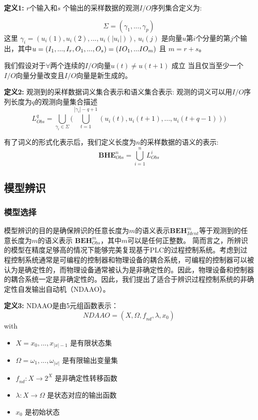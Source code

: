 \textbf{定义1:} \( r \)个输入和$ s $ 个输出的采样数据的观测$I/O$序列集合定义为:

\begin{equation} 
\Sigma = (\gamma_1,...,\gamma_p) 
\end{equation} 这里 $\gamma_i = (u_i(1),u_i(2),...,u_i(|u_i|))$, $ u_i(j) $ 是向量$u$第$i$个分量的第$j$个输出，其中$ u = (I_1,...,I_r,O_1,\\...,O_s) = (IO_1,...IO_m) $ 且 $ m=r+s $。

我们假设对于$ \forall $两个连续的$I/O$向量$ u(t)\neq u(t + 1)$ 成立
当且仅当至少一个$I/O$向量分量改变且$I/O$向量是新生成的。

\textbf{定义2:} 观测到的采样数据词义集合表示和语义集合表示: 观测的词义可以用$I/O$序列长度为$q$的观测向量集合描述 
\[
L_{Obs}^q = \bigcup_{\gamma_i \in \Sigma} \Big(\bigcup_{t=1}^{|\gamma_i|-q+1} (u_i(t),u_i(t+1),...,u_i(t+q-1))\Big) 
\]

有了词义的形式化表示后，我们定义长度为$n$的采样数据的语义的表示:
\begin{equation}
 \textbf{BHE}_{Obs}^n = \bigcup_{i=1}^n L_{Obs}^i 
\end{equation}

\subsection{模型辨识}

\subsubsection{模型选择}

模型辨识的目的是确保辨识的任意长度为$ m $的语义表示$ \textbf {BEH}_{Ident}^m $等于观测到的任意长度为$ m $的语义表示  \( \textbf{BEH}_{Obs}^m \)，其中$ m $可以是任何正整数。 简而言之，所辨识的模型在精度足够高的情况下能够完美复现基于PLC的过程控制系统。考虑到过程控制系统通常是可编程的控制器和物理设备的耦合系统，可编程的控制器可以被认为是确定性的，而物理设备通常被认为是非确定性的。因此，物理设备和控制器的耦合系统一定是非确定性的。因此，我们提出了适合于辨识过程控制系统的非确定性自发输出自动机（NDAAO）\parencite{klein2005}。

\textbf{定义3:} NDAAO是由5元组函数表示： \[ NDAAO=(X,\Omega,\textit{f}_{nd},\lambda,x_0) \] with\
\begin{itemize}
  \item $ X={x_0,...,x_{|x|-1}} $ 是有限状态集
  \item $ \Omega={\omega_1,...,\omega_{|\omega|}} $ 是有限输出变量集
  \item $ \textit{f}_{nd}: X\rightarrow 2^X $ 是非确定性转移函数
  \item $ \lambda: X\rightarrow \Omega $ 是状态对应的输出函数
  \item $x_0$ 是初始状态
\end{itemize}

